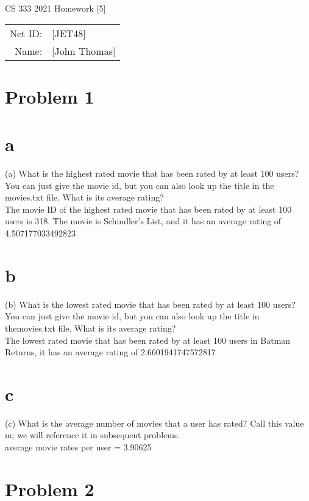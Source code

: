 \documentclass[12pt]{article}
\begin{document}
\begin{center}
{\Large CS 333 2021 Homework [5]}

\begin{tabular}{rl}
Net ID: & [JET48] \\
Name: & [John Thomas] \\
\end{tabular}
\end{center}

\section*{Problem 1 }
\section*{a}  
(a)  What  is  the  highest  rated  movie  that  has  been  rated  by  at  least  100  users?   You  can  just  give  the movie id, but you can also look up the title in the movies.txt file.  What is its average rating? \\
The movie ID of the highest rated movie that has been rated by at least 100 users is 318. The movie is Schindler's List, and it has an average rating of 4.507177033492823

\section*{b}  
(b)  What is the lowest rated movie that has been rated by at least 100 users? You can just give the movie id, but you can also look up the title in themovies.txt file.  What is its average rating? \\
The lowest rated movie that has been rated by at least 100 users in Batman Returns, it has an average rating of 2.6601941747572817
\section*{c}  
(c)  What is the average number of movies that a user has rated?  Call this value  m; we will reference it in subsequent problems. \\
average movie rates per user = 3.90625 \\
\section*{Problem 2}
\end{document}
